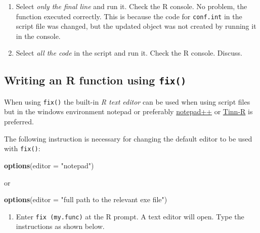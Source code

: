 \documentclass[
]{book}
\newenvironment{Shaded}{\begin{snugshade}}{\end{snugshade}}
\newcommand{\AttributeTok}[1]{\textcolor[rgb]{0.13,0.29,0.53}{#1}}
\newcommand{\FunctionTok}[1]{\textcolor[rgb]{0.13,0.29,0.53}{\textbf{#1}}}
\newcommand{\NormalTok}[1]{#1}
\newcommand{\StringTok}[1]{\textcolor[rgb]{0.31,0.60,0.02}{#1}}
\providecommand{\tightlist}{%
  \setlength{\itemsep}{0pt}\setlength{\parskip}{0pt}}
\begin{document}
\begin{enumerate}
\def\labelenumi{(\alph{enumi})}
\setcounter{enumi}{13}
\tightlist
\item
  Select \emph{only the final line} and run it. Check the R console. No problem, the function executed correctly. This is because the code for \texttt{conf.int} in the script file was changed, but the updated object was not created by running it in the console.
\item
  Select \emph{all the code} in the script and run it. Check the R console. Discuss.
\end{enumerate}

\subsection{\texorpdfstring{Writing an R function using \texttt{fix()}}{Writing an R function using fix()}}\label{writing-an-r-function-using-fix}

When using \texttt{fix()} the built-in \emph{{R text editor}} can be used when using script files but in the windows environment {notepad} or preferably \href{www.notepad-plus-plus.org/download/}{notepad++} or \href{https://tinn-r.org/en/}{Tinn-R} is preferred.

The following instruction is necessary for changing the default editor to be used with \texttt{fix()}:

\begin{Shaded}
\begin{Highlighting}[]
\FunctionTok{options}\NormalTok{(}\AttributeTok{editor =} \StringTok{"notepad"}\NormalTok{)}
\end{Highlighting}
\end{Shaded}

or

\begin{Shaded}
\begin{Highlighting}[]
\FunctionTok{options}\NormalTok{(}\AttributeTok{editor =} \StringTok{"full path to the relevant exe file"}\NormalTok{)}
\end{Highlighting}
\end{Shaded}

\begin{enumerate}
\def\labelenumi{(\alph{enumi})}
\tightlist
\item
  Enter \texttt{fix\ (my.func)} at the R prompt. A text editor will open. Type the instructions as shown below.
\end{enumerate}
\end{document}
